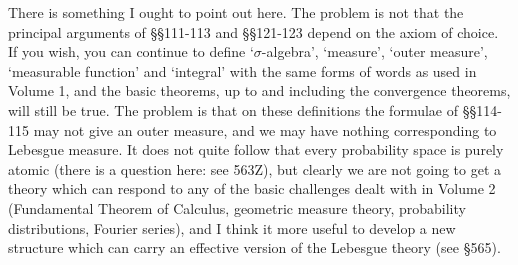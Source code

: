 {There is something I ought to point out here.   The problem is not that the
principal arguments of \S\S111-113 and \S\S121-123 depend on the axiom of
choice.   If you wish, you can continue to define `$\sigma$-algebra',
`measure', `outer measure', `measurable function' and `integral' with the
same forms of words as used in Volume 1, and the basic theorems, up to and
including the convergence theorems, will still be true.   The problem is
that on these definitions the formulae of \S\S114-115 may not give an outer
measure, and we may have nothing corresponding to Lebesgue measure.   It
does not quite follow that every probability space is purely atomic
(there is a question here:  see
563Z), but clearly we are not going to get a theory which can respond to
any of the basic challenges dealt with in Volume 2
(Fundamental Theorem of Calculus, geometric measure
theory, probability distributions, Fourier series), and I think it more
useful to develop a new structure which can carry an effective
version of the Lebesgue theory (see \S565).
}%

\discrpage

